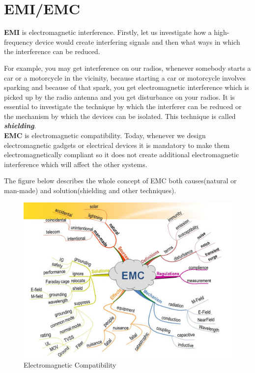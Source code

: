 \section{EMI/EMC}

\textbf{EMI} is electromagnetic interference.
Firstly, let us investigate how a high-frequency device would create interfering signals and then what ways in which the interference can be reduced.

For example, you may get interference on our radios, whenever somebody starts a car or a motorcycle in the vicinity, because starting a car or motorcycle involves sparking and because of that spark, you get electromagnetic interference which is picked up by the radio antenna and you get disturbance on your radios. It is essential to investigate the technique by which the interferer can be reduced or the mechanism by which the devices can be isolated. This technique is called \textit{\textbf{shielding}}.\\

\textbf{EMC} is electromagnetic compatibility. Today, whenever we design electromagnetic gadgets or electrical devices it is mandatory to make them electromagnetically compliant so it does not create additional electromagnetic interference which will affect the other systems.

The figure below describes the whole concept of EMC both causes(natural or man-made) and solution(shielding and other techniques).
\begin{figure}[h]
\centering
\includegraphics[scale=0.35]{./graphics/634771461726914062}
\caption{Electromagnetic Compatibility}
\end{figure}
